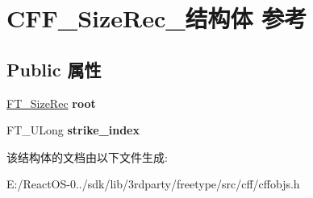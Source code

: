 \hypertarget{struct_c_f_f___size_rec__}{}\section{C\+F\+F\+\_\+\+Size\+Rec\+\_\+结构体 参考}
\label{struct_c_f_f___size_rec__}
\subsection*{Public 属性}
\begin{DoxyCompactItemize}
\item 
\mbox{\label{struct_c_f_f___size_rec___abb30943bad9b5c4c966b4bf23a6594a4}} 
\hyperlink{struct_f_t___size_rec__}{F\+T\+\_\+\+Size\+Rec} {\bfseries root}
\item 
\mbox{\label{struct_c_f_f___size_rec___addb560939c6d5a60749aa3e3ff782ccb}} 
F\+T\+\_\+\+U\+Long {\bfseries strike\+\_\+index}
\end{DoxyCompactItemize}


该结构体的文档由以下文件生成\+:\begin{DoxyCompactItemize}
\item 
E\+:/\+React\+O\+S-\/0../sdk/lib/3rdparty/freetype/src/cff/cffobjs.\+h\end{DoxyCompactItemize}
